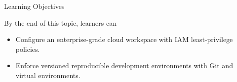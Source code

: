 \documentclass[../m00-session-01.tex]{subfiles}
\begin{document}

\begin{frame}{Learning Objectives}
  \begin{LearningObjectives}{By the end of this topic, learners can}
    \begin{itemize}
      \item Configure an enterprise-grade cloud workspace with IAM least-privilege policies.
      \item Enforce versioned reproducible development environments with Git and virtual environments.
    \end{itemize}
  \end{LearningObjectives}
\end{frame}
\end{document}
